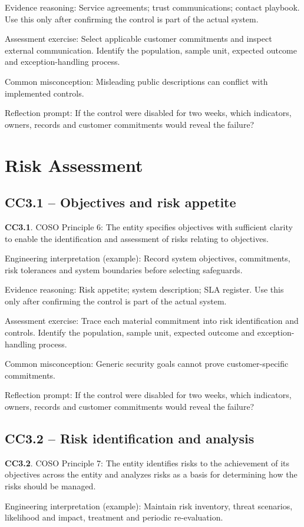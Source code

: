 \documentclass[10pt,oneside]{report}
\begin{document}
Evidence reasoning: Service agreements; trust communications; contact playbook. Use this only after confirming the control is part of the actual system.

Assessment exercise: Select applicable customer commitments and inspect external communication. Identify the population, sample unit, expected outcome and exception-handling process.

Common misconception: Misleading public descriptions can conflict with implemented controls.

Reflection prompt: If the control were disabled for two weeks, which indicators, owners, records and customer commitments would reveal the failure?

\section{Risk Assessment}
\subsection{CC3.1 -- Objectives and risk appetite}
\begin{aicpabox}
\textbf{CC3.1}. COSO Principle 6: The entity specifies objectives with sufficient clarity to enable the identification and assessment of risks relating to objectives.\par{}
\end{aicpabox}
Engineering interpretation (example): Record system objectives, commitments, risk tolerances and system boundaries before selecting safeguards.

Evidence reasoning: Risk appetite; system description; SLA register. Use this only after confirming the control is part of the actual system.

Assessment exercise: Trace each material commitment into risk identification and controls. Identify the population, sample unit, expected outcome and exception-handling process.

Common misconception: Generic security goals cannot prove customer-specific commitments.

Reflection prompt: If the control were disabled for two weeks, which indicators, owners, records and customer commitments would reveal the failure?

\subsection{CC3.2 -- Risk identification and analysis}
\begin{aicpabox}
\textbf{CC3.2}. COSO Principle 7: The entity identifies risks to the achievement of its objectives across the entity and analyzes risks as a basis for determining how the risks should be managed.\par{}
\end{aicpabox}
Engineering interpretation (example): Maintain risk inventory, threat scenarios, likelihood and impact, treatment and periodic re-evaluation.
\end{document}
